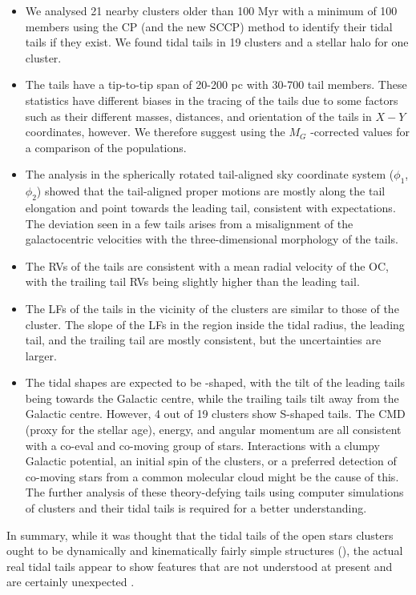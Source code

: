 \documentclass{aa}
\begin{document}
\begin{itemize}
    \item We analysed 21 nearby clusters older than 100 Myr with a minimum of 100 members using the CP (and the new SCCP) method to identify their tidal tails if they exist. We found tidal tails in 19 clusters and a stellar halo for one cluster. 
    \item The tails have a tip-to-tip span of 20-200 pc with 30-700 tail members. These statistics have different biases in the tracing of the tails due to some factors such as their different masses, distances, and orientation of the tails in $X-Y$ coordinates, however. We therefore suggest using the $M_{G}$ -corrected values for a comparison of the populations. 
    \item The analysis in the spherically rotated tail-aligned sky coordinate system ($\phi_1$, $\phi_2$) showed that the tail-aligned proper motions are mostly along the tail elongation and point towards the leading tail, consistent with expectations. The deviation seen in a few tails arises from a misalignment of the galactocentric velocities with the three-dimensional morphology of the tails.
    \item The RVs of the tails are consistent with a mean radial velocity of the OC, with the trailing tail RVs being slightly higher than the leading tail.
    \item The LFs of the tails in the vicinity of the clusters are similar to those of the cluster. The slope of the LFs in the region inside the tidal radius, the leading tail, and the trailing tail are mostly consistent, but the uncertainties are larger. 
    \item The tidal shapes are expected to be -shaped, with the tilt of the leading tails being towards the Galactic centre, while the trailing tails tilt away from the Galactic centre. However, 4 out of 19 clusters show S-shaped tails. 
    The CMD (proxy for the stellar age), energy, and angular momentum are all consistent with a co-eval and co-moving group of stars.
    Interactions with a clumpy Galactic potential, an initial spin of the clusters, or a preferred detection of co-moving stars from a common molecular cloud might be the cause of this. 
    The further analysis of these theory-defying tails using computer simulations of clusters and their tidal tails is required for a better understanding.
\end{itemize}

In summary, while it was thought that the tidal tails of the open stars clusters ought to be dynamically and kinematically fairly simple structures (\citealt{2020A&A...640A..84Dinnbier,2021A&A...647A.137Jerabkova,2010MNRAS.401..105K,2009MNRAS.392..969Just}), the actual real tidal tails appear to show features that are not understood at present and are certainly unexpected \citep[e.g.][]{2022MNRAS.517.3613Kroupa,2024ApJ...970...94Kroupa}.
\end{document}

